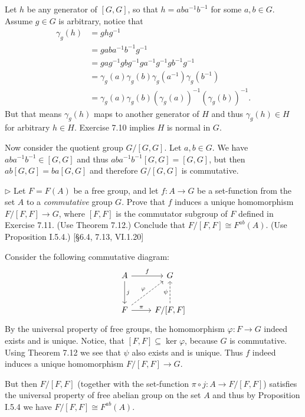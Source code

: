 \begin{solution}
	Let $h$ be any generator of $[G, G]$, so that $h = aba^{-1}b^{-1}$ for some $a, b \in G$. Assume $g \in G$ is arbitrary, notice that
	\begin{equation*}
		\begin{aligned}
			\gamma_g(h)
			&= ghg^{-1} \\
			&= gaba^{-1}b^{-1}g^{-1} \\
			&= gag^{-1} gbg^{-1} ga^{-1}g^{-1} gb^{-1}g^{-1} \\
			&= \gamma_g(a) \gamma_g(b) \gamma_g(a^{-1}) \gamma_g(b^{-1}) \\
			&= \gamma_g(a) \gamma_g(b) (\gamma_g(a))^{-1} (\gamma_g(b))^{-1} \text{.}
		\end{aligned}
	\end{equation*}
	But that means $\gamma_g(h)$ maps to another generator of $H$ and thus $\gamma_g(h) \in H$ for arbitrary $h \in H$. Exercise 7.10 implies $H$ is normal in $G$.
	
	Now consider the quotient group $G/[G, G]$. Let $a, b \in G$. We have $aba^{-1}b^{-1} \in [G, G]$ and thus $aba^{-1}b^{-1} [G,G] = [G, G]$, but then $ab [G,G] = ba [G,G]$ and therefore $G/[G, G]$ is commutative.
\end{solution}

\begin{problem}
	$\triangleright$ Let $F = F(A)$ be a free group, and let $f: A \to G$ be a set-function from the set $A$ to a \emph{commutative} group $G$. Prove that $f$ induces a unique homomorphism $F/[F, F] \to G$, where $[F, F]$ is the commutator subgroup of $F$ defined in Exercise 7.11. (Use Theorem 7.12.) Conclude that $F/[F, F] \cong F^{ab}(A)$. (Use Proposition I.5.4.) [\S6.4, 7.13, VI.1.20] 
\end{problem}

\begin{solution}
	Consider the following commutative diagram:
	\begin{equation*}
		\begin{tikzcd}[row sep=large]
			A
			\arrow[r, "f"]
			\arrow[d, "j"]
			& G \\
			F
			\arrow[ur, dashrightarrow, "\varphi"]
			\arrow[r, "\pi"]
			& F/[F, F]
			\arrow[u, dashrightarrow, "\psi"]
		\end{tikzcd}
	\end{equation*}
	By the universal property of free groups, the homomorphism $\varphi: F \to G$ indeed exists and is unique. Notice, that $[F, F] \subseteq \ker \varphi$, because $G$ is commutative. Using Theorem 7.12 we see that $\psi$ also exists and is unique. Thus $f$ indeed induces a unique homomorphism $F/[F, F] \to G$.
	
	But then $F/[F, F]$ (together with the set-function $\pi \circ j: A \to F/[F, F]$) satisfies the universal property of free abelian group on the set $A$ and thus by Proposition I.5.4 we have $F/[F, F] \cong F^{ab}(A)$.
\end{solution}

